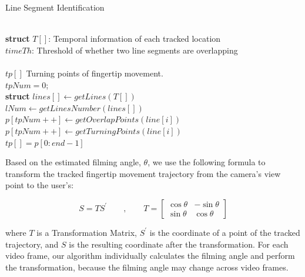 \renewcommand{\algorithmicforall}{\textbf{for each}}
    \begin{algorithm}[!t]
        \caption{Line Segment Identification}
        \label{alg:turning-point}
        \begin{algorithmic}[1]
            \REQUIRE~~\\
                \textbf{struct} $T[]$: Temporal information of each tracked location\\
                $timeTh$: Threshold of whether two line segments are overlapping \\
            \ENSURE~~\\
                $tp[]$ Turning points of fingertip movement. \\
                \STATE $tpNum=0$; \\
                \STATE \textbf{struct} $lines[] \leftarrow getLines(T[]) $ \\
                \STATE $lNum \leftarrow getLinesNumber(lines[])$ \\
                        \STATE $p[tpNum++] \leftarrow getOverlapPoints(line[i])$ \\
                    \ENDIF
                    \STATE $p[tpNum++] \leftarrow getTurningPoints(line[i])$ \\
                \ENDFOR
            \ENDFOR
            \STATE $tp[]=p[0:end-1]$\\
        \end{algorithmic}
    \end{algorithm}


Based on the estimated filming angle, $\theta$, we use the following formula to transform the tracked fingertip movement trajectory from the camera's view point to the user's:

\begin{equation}
        S=TS^{'} \qquad, \qquad  T=\left[ \begin{matrix} \cos\theta & -\sin\theta \\ \sin\theta & \cos\theta \end{matrix} \right]
\end{equation}

where $T$ is a Transformation Matrix, $S^{'}$ is the coordinate of a point of the tracked trajectory, and $S$ is the resulting coordinate after the transformation.
For each video frame, our algorithm individually calculates the filming angle and perform the transformation, because the filming angle may change across video frames.

